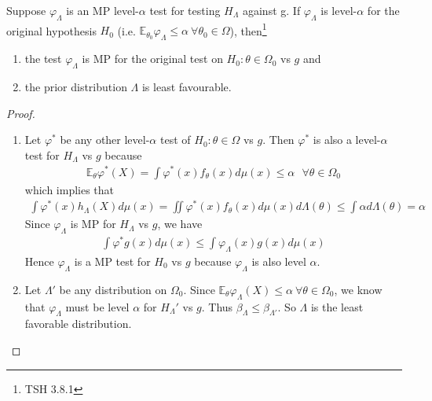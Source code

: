 \begin{theorem}\label{thm:convertcompsim}
    Suppose $\varphi_\Lambda$ is an MP level-$\alpha$ test for testing $H_\Lambda$ against g.
    If $\varphi_\Lambda$ is level-$\alpha$ for the original hypothesis $H_0$
    (i.e. $\mathbb{E}_{\theta_0}\varphi_\Lambda\leq\alpha~\forall\theta_0\in\Omega$), then\footnote{
    TSH 3.8.1
    }
    \begin{enumerate}[{(i)}]
        \item the test $\varphi_\Lambda$ is MP for the original test on $H_0:\theta\in\Omega_0$ vs $g$ and 
        \item the prior distribution $\Lambda$ is least favourable.
    \end{enumerate}
\end{theorem}
\begin{proof}
    $~$\\
    \begin{enumerate}[{(i)}]
        \item Let $\varphi^*$ be any other level-$\alpha$ test of $H_0:\theta\in\Omega$ vs $g$.
        Then $\varphi^*$ is also a level-$\alpha$ test for $H_\Lambda$ vs $g$
        because
        \begin{gather}
            \mathbb{E}_\theta\varphi^*(X)=\int{\varphi^*(x)f_\theta(x)}d\mu(x)\leq\alpha~~~\forall{\theta}\in\Omega_0
        \end{gather}
        which implies that 
        \begin{gather}
            \int{\varphi^*(x)h_\Lambda(X)}d\mu(x)
            = \iint\varphi^*(x)f_\theta(x)d\mu(x)d\Lambda(\theta)
            \leq \int{\alpha}d\Lambda(\theta)
            =\alpha
        \end{gather}
        Since $\varphi_\Lambda$ is MP for $H_\Lambda$ vs $g$, we have 
        \begin{gather}
            \int\varphi^*g(x)d\mu(x)\leq\int{\varphi_\Lambda(x)g(x)}d\mu(x)
        \end{gather}
        Hence $\varphi_\Lambda$ is a MP test for $H_0$ vs $g$ because $\varphi_\Lambda$ is also level $\alpha$.
        \item Let $\Lambda'$ be any distribution on $\Omega_0$.
        Since $\mathbb{E}_\theta\varphi_\Lambda(X)\leq\alpha~\forall\theta\in\Omega_0$,
        we know that $\varphi_\Lambda$ must be level $\alpha$ for $H_\Lambda'$ vs $g$.
        Thus $\beta_\Lambda\leq\beta_{\Lambda'}$.
        So $\Lambda$ is the least favorable distribution.
    \end{enumerate}
\end{proof}

